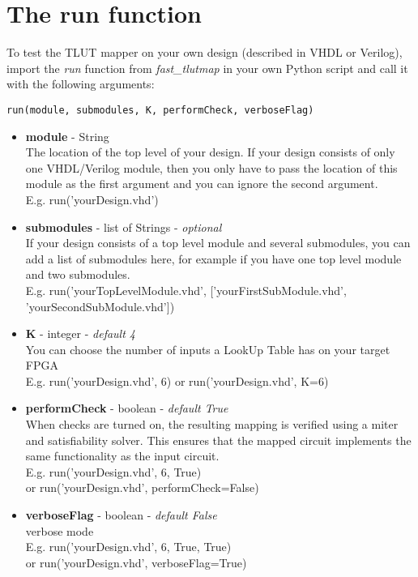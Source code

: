 \documentclass[a4paper,oneside]{memoir}
\begin{document}
\section{The run function}\label{sec:run_function}
To test the TLUT mapper on your own design (described in VHDL or Verilog), import the \emph{run} function from \emph{fast\_tlutmap} in your own Python script and call it with the following arguments:
\begin{lstlisting}
run(module, submodules, K, performCheck, verboseFlag)
\end{lstlisting}
\begin{itemize}
\item \textbf{module} - String\\
The location of the top level of your design. If your design consists of only one VHDL/Verilog module, then you only have to pass the location of this module as the first argument and you can ignore the second argument.\\

E.g. run('yourDesign.vhd')

\item \textbf{submodules} - list of Strings - \textit{optional}\\
If your design consists of a top level module and several submodules, you can add a list of submodules here, for example if you have one top level module and two submodules.\\

E.g. run('yourTopLevelModule.vhd', ['yourFirstSubModule.vhd', 'yourSecondSubModule.vhd'])

\item \textbf{K} - integer - \textit{default 4}\\
You can choose the number of inputs a LookUp Table has on your target FPGA\\

E.g. run('yourDesign.vhd', 6)
or run('yourDesign.vhd', K=6)

\item \textbf{performCheck} - boolean - \textit{default True}\\
When checks are turned on, the resulting mapping is verified using a miter and satisfiability solver. This ensures that the mapped circuit implements the same functionality as the input circuit.\\

E.g. run('yourDesign.vhd', 6, True)\\
or run('yourDesign.vhd', performCheck=False)

\item \textbf{verboseFlag} - boolean - \textit{default False}\\
verbose mode\\
E.g. run('yourDesign.vhd', 6, True, True)\\ or run('yourDesign.vhd', verboseFlag=True)
\end{itemize}
\end{document}
